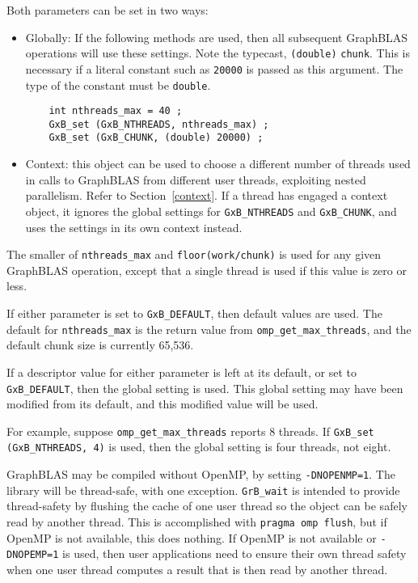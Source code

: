\documentclass[12pt]{article}
\begin{document}
Both parameters can be set in two ways:

\begin{itemize}

\item Globally:  If the following methods are used, then all subsequent
GraphBLAS operations will use these settings.  Note the typecast,
\verb'(double)' \verb'chunk'.  This is necessary if a literal constant such as
\verb'20000' is passed as this argument.  The type of the constant must be
\verb'double'.

    {\footnotesize
    \begin{verbatim}
    int nthreads_max = 40 ;
    GxB_set (GxB_NTHREADS, nthreads_max) ;
    GxB_set (GxB_CHUNK, (double) 20000) ; \end{verbatim} }

\item Context: this object can be used to choose a different number of
threads used in calls to GraphBLAS from different user threads, exploiting
nested parallelism.  Refer to Section~\ref{context}.  If a thread has engaged a
context object, it ignores the global settings for \verb'GxB_NTHREADS' and
\verb'GxB_CHUNK', and uses the settings in its own context instead.

\end{itemize}

The smaller of \verb'nthreads_max' and \verb'floor(work/chunk)' is used for any
given GraphBLAS operation, except that a single thread is used if this value is
zero or less.

If either parameter is set to \verb'GxB_DEFAULT', then default values are used.
The default for \verb'nthreads_max' is the return value from
\verb'omp_get_max_threads', and the default chunk size is currently 65,536.

If a descriptor value for either parameter is left at its default, or set to
\verb'GxB_DEFAULT', then the global setting is used.  This global setting may
have been modified from its default, and this modified value will be used.

For example, suppose \verb'omp_get_max_threads' reports 8 threads.  If \newline
\verb'GxB_set (GxB_NTHREADS, 4)' is used, then the global setting is four
threads, not eight.

GraphBLAS may be compiled without OpenMP, by setting \verb'-DNOPENMP=1'.
The library will be thread-safe, with one exception.  \verb'GrB_wait' is
intended to provide thread-safety by flushing the cache of one user thread
so the object can be safely read by another thread.  This is accomplished
with \verb'pragma omp flush', but if OpenMP is not available, this does
nothing.  If OpenMP is not available or \verb'-DNOPEMP=1' is used, then
user applications need to ensure their own thread safety when one user thread
computes a result that is then read by another thread.
\end{document}
